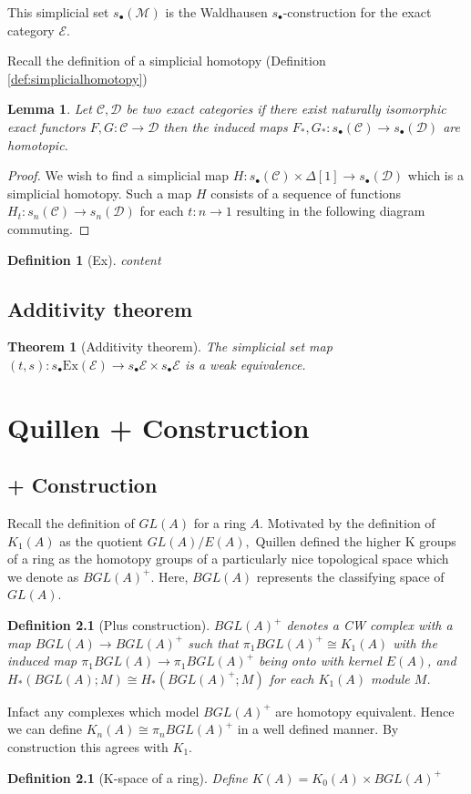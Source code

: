 \documentclass[12pt]{report}
\numberwithin{equation}{section}
\newtheorem{theorem}[dummy]{Theorem}
\newtheorem{definition}[dummy]{Definition}
\newtheorem{lemma}[dummy]{Lemma}
\begin{document}
	This simplicial set $s_\bullet(\mathcal{M})$ is the Waldhausen \( s_\bullet \)-construction for the exact category $\mathcal{E}$.
	
	Recall the definition of a simplicial homotopy (Definition \ref{def:simplicialhomotopy}) 
	
	\begin{lemma}
		Let \( \mathcal{C, D} \) be two exact categories if there exist naturally isomorphic exact functors \( F,G: \mathcal{C} \to \mathcal{D} \) then the induced maps \( F_*,G_*: s_\bullet(\mathcal{C}) \to s_\bullet(\mathcal{D})\) are homotopic.
	\end{lemma}
	\begin{proof}
		We wish to find a simplicial map \( H: s_\bullet(\mathcal{C}) \times \Delta[1] \to s_\bullet(\mathcal{D})\) which is a simplicial homotopy. Such a map \( H \) consists of a sequence of functions \( H_t: s_n(\mathcal{C}) \to s_n(\mathcal{D}) \) for each \( t: n \to 1 \) resulting in the following diagram commuting.
	\end{proof}
	
	\begin{definition}[Ex]
		content
	\end{definition}
	\section{Additivity theorem}
	\begin{theorem}[Additivity theorem]
		The simplicial set map \( (t,s) : s_\bullet \mathrm{Ex}(\mathcal{E}) \to s_\bullet \mathcal{ E}  \times s_\bullet \mathcal{E}\) is a weak equivalence.
	\end{theorem}
	
	\chapter{Quillen + Construction}
	
	
	\section{+ Construction}
	Recall the definition of $GL(A)$ for a ring $A$. Motivated by the definition of $K_1(A) $ as the quotient $GL(A)/E(A),$ Quillen defined the higher K groups of a ring as the homotopy groups of a particularly nice topological space which we denote as $BGL(A)^+$. Here, $BGL(A)$ represents the classifying space of $GL(A)$.
	
	\begin{definition}[Plus construction]
		$BGL(A)^+$ denotes a CW complex with a map $BGL(A)\to BGL(A)^+$ such that $\pi_1 BGL(A)^+ \cong K_1(A)$ with the induced map $\pi_1BGL(A) \to \pi_1 BGL(A)^+$ being onto with kernel $E(A)$, and $H_*(BGL(A);	M) \cong H_*(BGL(A)^+;M) $ for each $K_1(A)$ module $M$.
	\end{definition}
	Infact any complexes which model $BGL(A)^+$ are homotopy equivalent. Hence we can define $K_n(A)\cong \pi_n BGL(A)^+$ in a well defined manner. By construction this agrees with $K_1$.
	\begin{definition}[K-space of a ring]
		Define $K(A) = K_0(A)\times BGL(A)^+$
	\end{definition}
\end{document}
